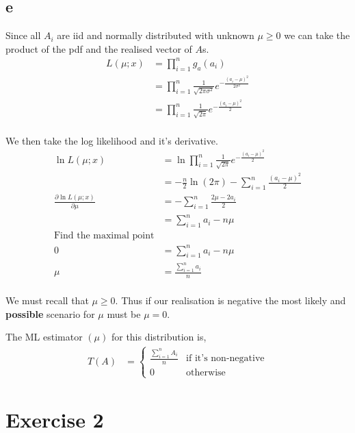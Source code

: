 \documentclass{article}
\begin{document}
\subsection{e}
Since all $A_i$ are iid and normally distributed with unknown $\mu \geq 0$ we
can take the product of the pdf and the realised vector of $A$s.
\begin{align*}
    L(\mu;x) &= \prod_{i=1}^n g_a (a_i) \\
    &= \prod_{i=1}^n \frac{1}{\sqrt{2\pi\sigma^2}} e^{-\frac{{(a_i-\mu)}^2}{2\sigma^2}} \\
    &= \prod_{i=1}^n \frac{1}{\sqrt{2\pi}} e^{-\frac{{(a_i-\mu)}^2}{2}} \\
\end{align*}

We then take the log likelihood and it's derivative.
\begin{align*}
    \ln L(\mu;x) &= \ln \prod_{i=1}^n \frac{1}{\sqrt{2\pi}} e^{-\frac{{(a_i-\mu)}^2}{2}} \\
    &= -\frac{n}{2} \ln(2\pi) - \sum_{i=1}^n \frac{{(a_i-\mu)}^2}{2} \\
    \frac{\partial \ln L(\mu;x)}{\partial \mu}
    &= - \sum_{i=1}^n \frac{2\mu - 2a_i}{2} \\
    &= \sum_{i=1}^n a_i - n\mu \\
    \text{Find the maximal point} \\
    0 &= \sum_{i=1}^n a_i - n\mu \\
    \mu &= \frac{\sum_{i=1}^n a_i}{n} \\
\end{align*}

We must recall that $\mu \geq 0$. Thus if our realisation is negative the most
likely and \textbf{possible} scenario for $\mu$ must be $\mu = 0$.

The ML estimator $(\mu)$ for this distribution is,
\begin{align*}
    T(A)
    &=
    \begin{cases}
        \frac{\sum_{i=1}^n A_i}{n} &\text{if it's non-negative} \\
        0 &\text{otherwise}
    \end{cases}
\end{align*}

\section{Exercise 2}
\end{document}
